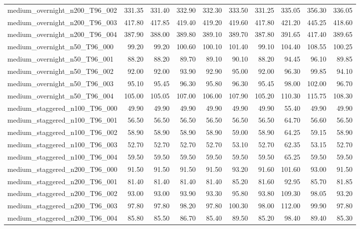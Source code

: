 \begin{table}[htbp]
\begin{tabular}{lrrrrrrrrr}
medium\_overnight\_n200\_T96\_002 & 331.35 & 331.40 & 332.90 & 332.30 & 333.50 & 331.25 & 335.05 & 356.30 & 336.05 \\
medium\_overnight\_n200\_T96\_003 & 417.80 & 417.85 & 419.40 & 419.20 & 419.60 & 417.80 & 421.20 & 445.25 & 418.60 \\
medium\_overnight\_n200\_T96\_004 & 387.90 & 388.00 & 389.80 & 389.10 & 389.70 & 387.80 & 391.65 & 417.40 & 389.65 \\
medium\_overnight\_n50\_T96\_000 & 99.20 & 99.20 & 100.60 & 100.10 & 101.40 & 99.10 & 104.40 & 108.55 & 100.25 \\
medium\_overnight\_n50\_T96\_001 & 88.20 & 88.20 & 89.70 & 89.10 & 90.10 & 88.20 & 94.45 & 96.10 & 89.85 \\
medium\_overnight\_n50\_T96\_002 & 92.00 & 92.00 & 93.90 & 92.90 & 95.00 & 92.00 & 96.30 & 99.85 & 94.10 \\
medium\_overnight\_n50\_T96\_003 & 95.10 & 95.45 & 96.30 & 95.80 & 96.30 & 95.45 & 98.00 & 102.00 & 96.70 \\
medium\_overnight\_n50\_T96\_004 & 105.00 & 105.05 & 107.00 & 106.00 & 107.90 & 105.20 & 110.30 & 115.75 & 108.30 \\
medium\_staggered\_n100\_T96\_000 & 49.90 & 49.90 & 49.90 & 49.90 & 49.90 & 49.90 & 55.40 & 49.90 & 49.90 \\
medium\_staggered\_n100\_T96\_001 & 56.50 & 56.50 & 56.50 & 56.50 & 56.50 & 56.50 & 64.70 & 56.60 & 56.50 \\
medium\_staggered\_n100\_T96\_002 & 58.90 & 58.90 & 58.90 & 58.90 & 59.00 & 58.90 & 64.25 & 59.15 & 58.90 \\
medium\_staggered\_n100\_T96\_003 & 52.70 & 52.70 & 52.70 & 52.70 & 53.10 & 52.70 & 62.35 & 53.15 & 52.70 \\
medium\_staggered\_n100\_T96\_004 & 59.50 & 59.50 & 59.50 & 59.50 & 59.50 & 59.50 & 65.25 & 59.50 & 59.50 \\
medium\_staggered\_n200\_T96\_000 & 91.50 & 91.50 & 91.50 & 91.50 & 93.20 & 91.60 & 101.60 & 93.00 & 91.50 \\
medium\_staggered\_n200\_T96\_001 & 81.40 & 81.40 & 81.40 & 81.40 & 85.20 & 81.60 & 92.95 & 85.70 & 81.85 \\
medium\_staggered\_n200\_T96\_002 & 93.00 & 93.00 & 93.90 & 93.30 & 95.80 & 93.80 & 109.30 & 98.05 & 93.20 \\
medium\_staggered\_n200\_T96\_003 & 97.80 & 97.80 & 98.20 & 97.80 & 100.30 & 98.00 & 112.00 & 99.90 & 97.80 \\
medium\_staggered\_n200\_T96\_004 & 85.80 & 85.50 & 86.70 & 85.40 & 89.50 & 85.20 & 98.40 & 89.40 & 85.30 \\

\end{tabular}
\end{table}
